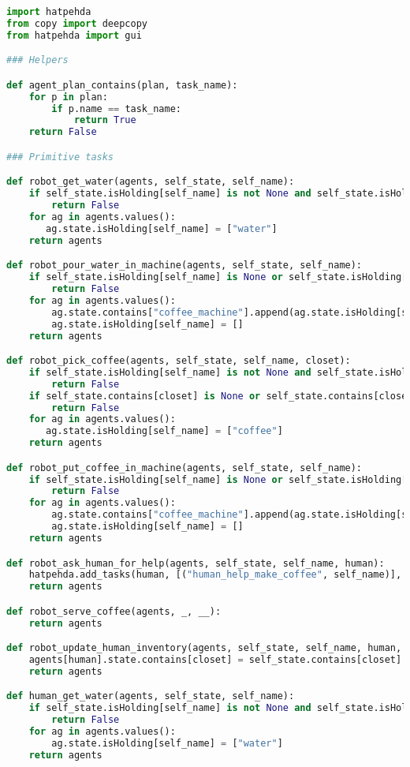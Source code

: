\begin{lstlisting}[language=Python]
import hatpehda
from copy import deepcopy
from hatpehda import gui

### Helpers

def agent_plan_contains(plan, task_name):
    for p in plan:
        if p.name == task_name:
            return True
    return False

### Primitive tasks

def robot_get_water(agents, self_state, self_name):
    if self_state.isHolding[self_name] is not None and self_state.isHolding[self_name] != []:
        return False
    for ag in agents.values():
       ag.state.isHolding[self_name] = ["water"]
    return agents

def robot_pour_water_in_machine(agents, self_state, self_name):
    if self_state.isHolding[self_name] is None or self_state.isHolding[self_name] == []:
        return False
    for ag in agents.values():
        ag.state.contains["coffee_machine"].append(ag.state.isHolding[self_name][0])
        ag.state.isHolding[self_name] = []
    return agents

def robot_pick_coffee(agents, self_state, self_name, closet):
    if self_state.isHolding[self_name] is not None and self_state.isHolding[self_name] != []:
        return False
    if self_state.contains[closet] is None or self_state.contains[closet] == []:
        return False
    for ag in agents.values():
       ag.state.isHolding[self_name] = ["coffee"]
    return agents

def robot_put_coffee_in_machine(agents, self_state, self_name):
    if self_state.isHolding[self_name] is None or self_state.isHolding[self_name] == []:
        return False
    for ag in agents.values():
        ag.state.contains["coffee_machine"].append(ag.state.isHolding[self_name][0])
        ag.state.isHolding[self_name] = []
    return agents

def robot_ask_human_for_help(agents, self_state, self_name, human):
    hatpehda.add_tasks(human, [("human_help_make_coffee", self_name)], agents)
    return agents

def robot_serve_coffee(agents, _, __):
    return agents

def robot_update_human_inventory(agents, self_state, self_name, human, closet):
    agents[human].state.contains[closet] = self_state.contains[closet]
    return agents

def human_get_water(agents, self_state, self_name):
    if self_state.isHolding[self_name] is not None and self_state.isHolding[self_name] != []:
        return False
    for ag in agents.values():
        ag.state.isHolding[self_name] = ["water"]
    return agents


\end{lstlisting}
